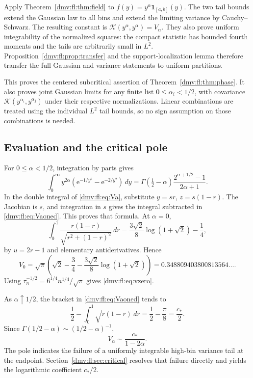 \documentclass[11pt,letterpaper]{article}
\numberwithin{equation}{section}
\theoremstyle{definition}\newtheorem{definition}[theorem]{Definition}
\theoremstyle{remark}\newtheorem{remark}[theorem]{Remark}
\newcommand{\ee}{\mathrm e}
\newcommand{\ind}{\mathbf 1}
\begin{document}
Apply Theorem~\ref{dmv:fl:thm:field} to
$f(y)=y^\alpha\ind_{[a,b]}(y)$. The two tail bounds extend the Gaussian
law to all bins and extend the limiting variance by Cauchy--Schwarz.
The resulting constant is $\mathcal K(y^\alpha,y^\alpha)=V_\alpha$.
They also prove uniform integrability of the normalized squares:
the compact statistic has bounded fourth moments and the tails are
arbitrarily small in $L^2$. Proposition~\ref{dmv:fl:prop:transfer} and the
support-localization lemma therefore transfer the full Gaussian and
variance statements to uniform partitions.

This proves the centered subcritical assertion of
Theorem~\ref{dmv:fl:thm:phase}. It also proves joint Gaussian limits for any
finite list $0\le\alpha_i<1/2$, with covariance
$\mathcal K(y^{\alpha_i},y^{\alpha_j})$ under their respective
normalizations. Linear combinations are treated using the individual
$L^2$ tail bounds, so no sign assumption on those combinations is needed.

\subsection{Evaluation and the critical pole}
For $0\le\alpha<1/2$, integration by parts gives
\[
 \int_0^\infty y^{2\alpha}
    (\ee^{-1/y^2}-\ee^{-2/y^2})\,dy
 =\Gamma(\tfrac12-\alpha)
       \frac{2^{\alpha+1/2}-1}{2\alpha+1}.
\]
In the double integral of \eqref{dmv:fl:eq:Va}, substitute $y=sr$,
$z=s(1-r)$. The Jacobian is $s$, and integration in $s$ gives the
integral subtracted in \eqref{dmv:fl:eq:Vaoned}. This proves that formula.
At $\alpha=0$,
\[
 \int_0^1\frac{r(1-r)}{\sqrt{r^2+(1-r)^2}}\,dr
 =\frac{3\sqrt2}{8}\log(1+\sqrt2)-\frac14,
\]
by $u=2r-1$ and elementary antiderivatives. Hence
\begin{equation}\label{dmv:fl:eq:Vzero}
 V_0=\sqrt\pi\left(\sqrt2-\frac34
 -\frac{3\sqrt2}{8}\log(1+\sqrt2)\right)
 =0.348809403800813564\ldots.
\end{equation}
Using $\tau_n^{-1/2}=6^{1/4}n^{1/4}/\sqrt\pi$ gives
\eqref{dmv:fl:eq:vzero}.

As $\alpha\uparrow1/2$, the bracket in \eqref{dmv:fl:eq:Vaoned} tends to
\[
 \frac12-\int_0^1\sqrt{r(1-r)}\,dr
 =\frac12-\frac\pi8=\frac{c_*}{2}.
\]
Since $\Gamma(1/2-\alpha)\sim(1/2-\alpha)^{-1}$,
\begin{equation}\label{dmv:fl:eq:variancepole}
 V_\alpha\sim\frac{c_*}{1-2\alpha}.
\end{equation}
The pole indicates the failure of a uniformly integrable high-bin
variance tail at the endpoint. Section~\ref{dmv:fl:sec:critical} resolves that
failure directly and yields the logarithmic coefficient $c_*/2$.
\end{document}
